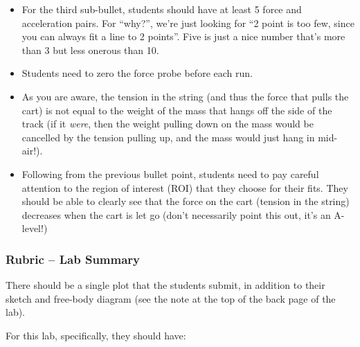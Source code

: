 \documentclass[fleqn,letterpaper]{article}
\begin{document}
\begin{itemize}
\item{For the third sub-bullet, students should have at least 5 force and acceleration pairs.  For ``why?'', we're just looking for ``2 point is too few, since you can always fit a line to 2 points''.  Five is just a nice number that's more than 3 but less onerous than 10.}
\item{Students need to zero the force probe before each run.}
\item{As you are aware, the tension in the string (and thus the force that pulls the cart) is not equal to the weight of the mass that hangs off the side of the track (if it \textit{were}, then the weight pulling down on the mass would be cancelled by the tension pulling up, and the mass would just hang in mid-air!).}
\item{Following from the previous bullet point, students need to pay careful attention to the region of interest (ROI) that they choose for their fits.  They should be able to clearly see that the force on the cart (tension in the string) decreases when the cart is let go (don't necessarily point this out, it's an A-level!)}
\end{itemize}

\subsubsection*{Rubric -- Lab Summary}

There should be a single plot that the students submit, in addition to their sketch and free-body diagram (see the note at the top of the back page of the lab).

For this lab, specifically, they should have:
\end{document}

